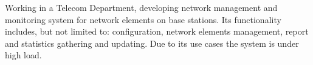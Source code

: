 Working in a Telecom Department, developing network management and monitoring system for network elements on base stations. Its functionality includes, but not limited to: configuration, network elements management, report and statistics gathering and updating. Due to its use cases the system is under high load.